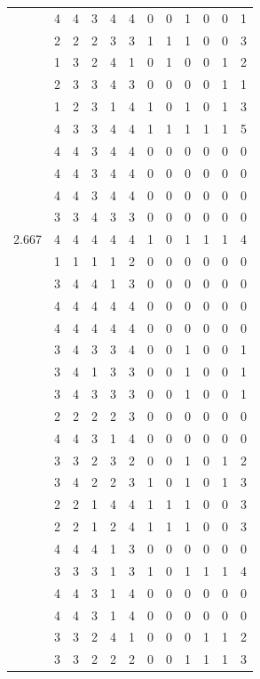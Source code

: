 \documentclass[]{book}
\theoremstyle{definition}
\theoremstyle{definition}
\theoremstyle{definition}
\theoremstyle{remark}
\begin{document}
\begin{table}
{\begin{tabular}[t]{rrrrrrrrrrrr}
 & 4 & 4 & 3 & 4 & 4 & 0 & 0 & 1 & 0 & 0 & 1\\
 & 2 & 2 & 2 & 3 & 3 & 1 & 1 & 1 & 0 & 0 & 3\\
 & 1 & 3 & 2 & 4 & 1 & 0 & 1 & 0 & 0 & 1 & 2\\
 & 2 & 3 & 3 & 4 & 3 & 0 & 0 & 0 & 0 & 1 & 1\\
 & 1 & 2 & 3 & 1 & 4 & 1 & 0 & 1 & 0 & 1 & 3\\
 & 4 & 3 & 3 & 4 & 4 & 1 & 1 & 1 & 1 & 1 & 5\\
 & 4 & 4 & 3 & 4 & 4 & 0 & 0 & 0 & 0 & 0 & 0\\
 & 4 & 4 & 3 & 4 & 4 & 0 & 0 & 0 & 0 & 0 & 0\\
 & 4 & 4 & 3 & 4 & 4 & 0 & 0 & 0 & 0 & 0 & 0\\
 & 3 & 3 & 4 & 3 & 3 & 0 & 0 & 0 & 0 & 0 & 0\\
2.667 & 4 & 4 & 4 & 4 & 4 & 1 & 0 & 1 & 1 & 1 & 4\\
 & 1 & 1 & 1 & 1 & 2 & 0 & 0 & 0 & 0 & 0 & 0\\
 & 3 & 4 & 4 & 1 & 3 & 0 & 0 & 0 & 0 & 0 & 0\\
 & 4 & 4 & 4 & 4 & 4 & 0 & 0 & 0 & 0 & 0 & 0\\
 & 4 & 4 & 4 & 4 & 4 & 0 & 0 & 0 & 0 & 0 & 0\\
 & 3 & 4 & 3 & 3 & 4 & 0 & 0 & 1 & 0 & 0 & 1\\
 & 3 & 4 & 1 & 3 & 3 & 0 & 0 & 1 & 0 & 0 & 1\\
 & 3 & 4 & 3 & 3 & 3 & 0 & 0 & 1 & 0 & 0 & 1\\
 & 2 & 2 & 2 & 2 & 3 & 0 & 0 & 0 & 0 & 0 & 0\\
 & 4 & 4 & 3 & 1 & 4 & 0 & 0 & 0 & 0 & 0 & 0\\
 & 3 & 3 & 2 & 3 & 2 & 0 & 0 & 1 & 0 & 1 & 2\\
 & 3 & 4 & 2 & 2 & 3 & 1 & 0 & 1 & 0 & 1 & 3\\
 & 2 & 2 & 1 & 4 & 4 & 1 & 1 & 1 & 0 & 0 & 3\\
 & 2 & 2 & 1 & 2 & 4 & 1 & 1 & 1 & 0 & 0 & 3\\
 & 4 & 4 & 4 & 1 & 3 & 0 & 0 & 0 & 0 & 0 & 0\\
 & 3 & 3 & 3 & 1 & 3 & 1 & 0 & 1 & 1 & 1 & 4\\
 & 4 & 4 & 3 & 1 & 4 & 0 & 0 & 0 & 0 & 0 & 0\\
 & 4 & 4 & 3 & 1 & 4 & 0 & 0 & 0 & 0 & 0 & 0\\
 & 3 & 3 & 2 & 4 & 1 & 0 & 0 & 0 & 1 & 1 & 2\\
 & 3 & 3 & 2 & 2 & 2 & 0 & 0 & 1 & 1 & 1 & 3\\

\end{tabular}}
\end{table}
\end{document}
